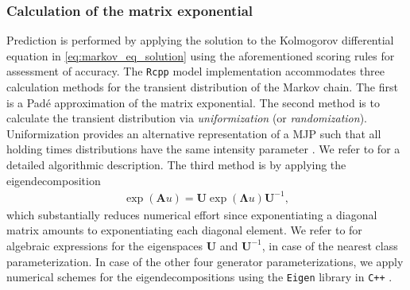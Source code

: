 \documentclass{article}
\providecommand{\DIFadd}[1]{{\protect\color{blue} \sf #1}} %
\providecommand{\DIFaddend}{} %
\begin{document}
\subsubsection{\DIFadd{Calculation of the matrix exponential}} \DIFaddend Prediction is performed by applying the solution to the Kolmogorov differential equation in \cref{eq:markov_eq_solution} using the aforementioned scoring rules for assessment of accuracy.
The \texttt{Rcpp} model implementation accommodates three calculation methods for the transient distribution of the Markov chain. The first is a Padé approximation of the matrix exponential. The second method is to calculate the transient distribution via \textit{uniformization} (or \textit{randomization}). Uniformization provides an alternative representation of a MJP such that all holding times distributions have the same intensity parameter \citep[Section 1.3.4]{bladt_nielsen}. We refer to \citet{sherlock2021a} for a detailed algorithmic description. The third method is by applying the eigendecomposition
\begin{align*}
    \exp{\left( \bm{A}u \right) } = \bm{U}  \exp{\left( \bm{\Lambda}u \right) } \bm{U}^{-1}, 
\end{align*}
which substantially reduces numerical effort since exponentiating a diagonal matrix amounts to exponentiating each diagonal element.
We refer to \citet{bisgaard2024A} for algebraic expressions for the eigenspaces $\bm{U}$ and $\bm{U}^{-1}$, in case of the nearest class parameterization. In case of the other four generator parameterizations, we apply numerical schemes for the eigendecompositions using the \texttt{Eigen} library in \texttt{C++} \citep{eigenweb}.
\end{document}
